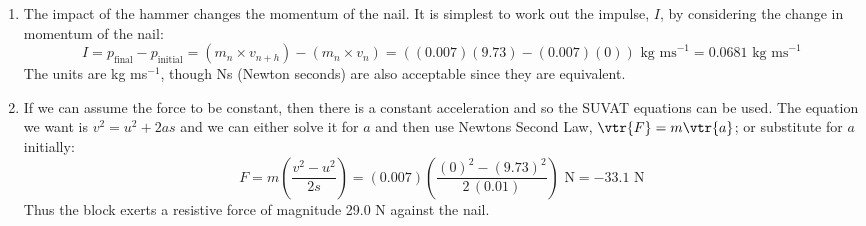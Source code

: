\begin{problem}[A1964AMIQ3a]
{\begin{enumerate}
	\item The impact of the hammer changes the momentum of the nail. It is simplest to work out the impulse, $I$, by considering the change in momentum of the nail:
\begin{equation*} I = p_{\textrm{final}} - p_{\textrm{initial}} = (m_{n} \times v_{n + h}) - (m_{n} \times v_{n}) = ((0.007)(9.73) - (0.007)(0)) \textrm{ kg ms}^{-1} = 0.0681  \textrm{ kg ms}^{-1}  \end{equation*}
The units are kg ms$^{-1}$, though Ns (Newton seconds) are also acceptable since they are equivalent.
	\item If we can assume the force to be constant, then there is a constant acceleration and so the SUVAT equations can be used. The equation we want is $v^{2} = u^{2} + 2as$ and we can either solve it for $a$ and then use Newtons Second Law, $\vtr{F} = m\vtr{a}$; or substitute for $a$ initially:
\begin{equation*} F = m \left( \frac{v^{2} - u^{2}}{2s} \right) = (0.007) \left( \frac{ (0)^{2} - (9.73)^{2}}{2 \,(0.01)} \right) \textrm{ N} = -33.1 \textrm{ N}\end{equation*}
Thus the block exerts a resistive force of magnitude 29.0 N against the nail.
\end{enumerate}
}
\end{problem}